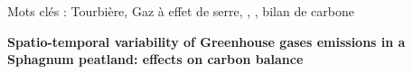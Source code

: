 {\begin{framed}
\begin{minipage}{\dimexpr\textwidth-2\fboxrule-2\fboxsep}
Mots cl\'es : Tourbière, Gaz à effet de serre, \coo, \chh, bilan de carbone
	\end{minipage}
\end{framed}

\vfill

\begin{center}
	\large \textbf{Spatio-temporal variability of Greenhouse gases emissions in a Sphagnum peatland: effects on carbon balance}
\end{center}

}
